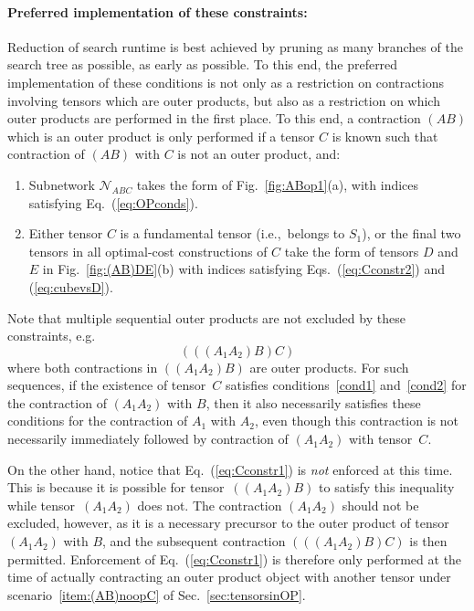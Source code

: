 \documentclass[aps,pre,reprint,superscriptaddress,amsfonts,amsmath,showpacs,nofootinbib,floatfix]{revtex4-1}
\newcommand{\mc}[1]{\mathcal{#1}}
\newcommand{\Eref}[1]{Eq.~(\ref{#1})}
\newcommand{\Erefs}[2]{Eqs.~(\ref{#1}) and (\ref{#2})}
\newcommand{\fref}[1]{Fig.~\ref{#1}}
\newcommand{\sref}[1]{Sec.~\ref{#1}}
\newcommand{\scref}[1]{scenario~\ref{#1}}
\begin{document}
\paragraph{Preferred implementation of these constraints:\label{sec:preferredimp}}
Reduction of search runtime is best achieved by pruning as many branches of the search tree as possible, as early as possible. To this end, the preferred implementation of these conditions is not only as a restriction on contractions involving tensors which are outer products, but also as a restriction on which outer products are performed in the first place. To this end, a contraction $(AB)$ which is an outer product is only performed if a tensor $C$ is known such that contraction of $(AB)$ with $C$ is not an outer product, and:
\begin{enumerate}
\item Subnetwork $\mc{N}_{ABC}$ takes the form of \fref{fig:ABop1}(a), with indices satisfying \Eref{eq:OPconds}. \label{cond1}
\item Either tensor $C$ is a fundamental tensor (i.e.,~belongs to $S_1$), or the final two tensors in all optimal-cost constructions of $C$ take the form of tensors $D$ and $E$ in \fref{fig:(AB)DE}(b) with indices satisfying \Erefs{eq:Cconstr2}{eq:cubevsD}.\label{cond2}
\end{enumerate}
Note that multiple sequential outer products are not excluded by these constraints, e.g.
\begin{equation}
(((A_1A_2)B)C) 
\end{equation}
where both contractions in $((A_1A_2)B)$ are outer products. For such sequences, if the existence of tensor~$C$ satisfies conditions~\ref{cond1} and~\ref{cond2} for the contraction of $(A_1A_2)$ with $B$, then it also necessarily satisfies these conditions for the contraction of $A_1$ with $A_2$, even though this contraction is not necessarily immediately followed by contraction of $(A_1A_2)$ with tensor~$C$.

On the other hand, notice that \Eref{eq:Cconstr1} is \emph{not} enforced at this time. This is because it is possible for tensor~$((A_1A_2)B)$ to satisfy this inequality while tensor~$(A_1A_2)$ does not. The contraction $(A_1A_2)$ should not be excluded, however, as it is a necessary precursor to the outer product of tensor~$(A_1A_2)$ with $B$, and the subsequent contraction $(((A_1A_2)B)C)$ is then permitted. Enforcement of
\Eref{eq:Cconstr1} 
is therefore only performed at the time of
actually contracting an outer product object with another tensor under \scref{item:(AB)noopC} of \sref{sec:tensorsinOP}.
\end{document}
